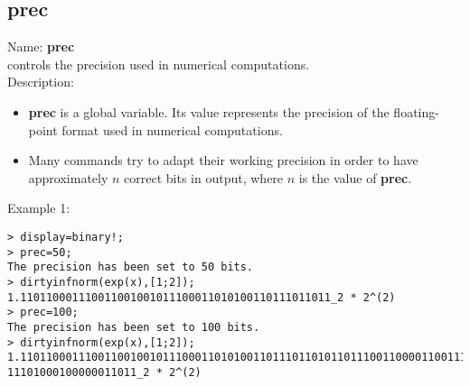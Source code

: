 \subsection{prec}
\label{labprec}
\noindent Name: \textbf{prec}\\
controls the precision used in numerical computations.\\
\noindent Description: \begin{itemize}

\item \textbf{prec} is a global variable. Its value represents the precision of the 
   floating-point format used in numerical computations.

\item Many commands try to adapt their working precision in order to have 
   approximately $n$ correct bits in output, where $n$ is the value of \textbf{prec}.
\end{itemize}
\noindent Example 1: 
\begin{center}\begin{minipage}{15cm}\begin{Verbatim}[frame=single]
> display=binary!;
> prec=50;
The precision has been set to 50 bits.
> dirtyinfnorm(exp(x),[1;2]);
1.110110001110011001001011100011010100110111011011_2 * 2^(2)
> prec=100;
The precision has been set to 100 bits.
> dirtyinfnorm(exp(x),[1;2]);
1.110110001110011001001011100011010100110111011010110111001100001100111010001110
11101000100000011011_2 * 2^(2)
\end{Verbatim}
\end{minipage}\end{center}
